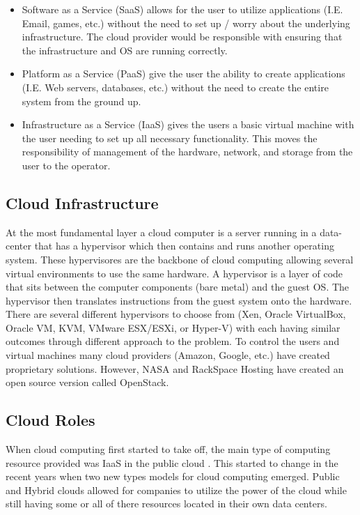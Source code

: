 \documentclass[12pt]{article}
\begin{document}
\begin{itemize}
    \item Software as a Service (SaaS) allows for the user to utilize applications (I.E. Email, games, etc.) without the need to set up / worry about the underlying infrastructure. The cloud provider would be responsible with ensuring that the infrastructure and OS are running correctly.
    \item Platform as a Service (PaaS) give the user the ability to create applications (I.E. Web servers, databases, etc.) without the need to create the entire system from the ground up.
    \item Infrastructure as a Service (IaaS) gives the users a basic virtual machine with the user needing to set up all necessary functionality. This moves the responsibility of management of the hardware, network, and storage from the user to the operator.
\end{itemize}

\subsection{Cloud Infrastructure}
At the most fundamental layer a cloud computer is a server running in a data-center that has a hypervisor which then contains and runs another operating system. These hypervisores are the backbone of cloud computing allowing several virtual environments to use the same hardware. A hypervisor is a layer of code that sits between the computer components (bare metal) and the guest OS\@. The hypervisor then translates instructions from the guest system onto the hardware. There are several different hypervisors to choose from (Xen, Oracle VirtualBox, Oracle VM, KVM, VMware ESX/ESXi, or Hyper-V) with each having similar outcomes through different approach to the problem. To control the users and virtual machines many cloud providers (Amazon, Google, etc.) have created proprietary solutions. However, NASA and RackSpace Hosting \cite{wikipedia1} have created an open source version called OpenStack.

\subsection{Cloud Roles}
When cloud computing first started to take off, the main type of computing resource provided was IaaS in the public cloud \cite{sourcedigit}. This started to change in the recent years when two new types models for cloud computing emerged. Public and Hybrid clouds allowed for companies to utilize the power of the cloud while still having some or all of there resources located in their own data centers.
\end{document}
